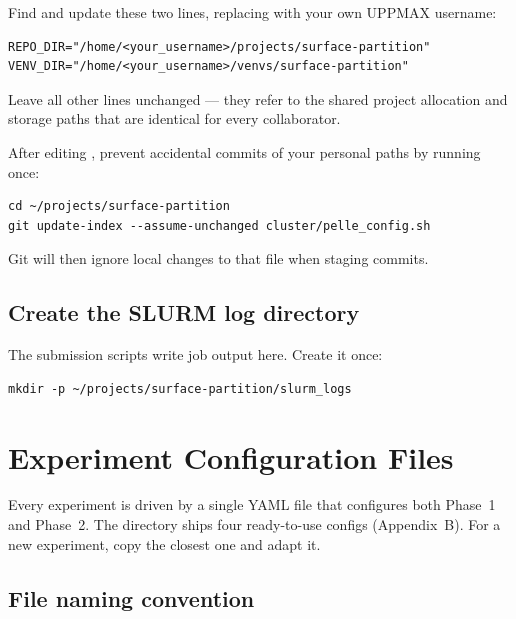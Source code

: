 \documentclass[11pt,a4paper]{article}
\begin{document}
Find and update these two lines, replacing  with your own
UPPMAX username:

\begin{lstlisting}[style=shell]
REPO_DIR="/home/<your_username>/projects/surface-partition"
VENV_DIR="/home/<your_username>/venvs/surface-partition"
\end{lstlisting}

Leave all other lines unchanged --- they refer to the shared project
allocation and storage paths that are identical for every collaborator.

\begin{tipbox}
After editing , prevent accidental commits of
your personal paths by running once:
\begin{lstlisting}[style=shell]
cd ~/projects/surface-partition
git update-index --assume-unchanged cluster/pelle_config.sh
\end{lstlisting}
Git will then ignore local changes to that file when staging commits.
\end{tipbox}

\subsection{Create the SLURM log directory}

The submission scripts write job output here.  Create it once:

\begin{lstlisting}[style=shell]
mkdir -p ~/projects/surface-partition/slurm_logs
\end{lstlisting}

\section{Experiment Configuration Files}
\label{sec:config-yaml}

Every experiment is driven by a single YAML file that configures both
Phase~1 and Phase~2.  The  directory ships four
ready-to-use configs (Appendix~B).  For a new experiment, copy the
closest one and adapt it.

\subsection{File naming convention}
\end{document}
